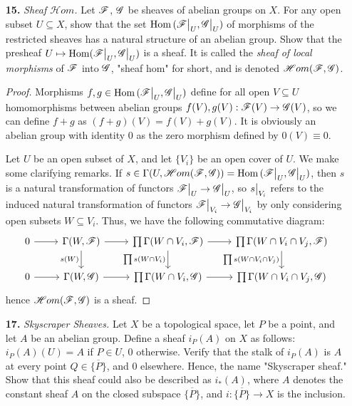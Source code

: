 \documentclass{article}
\begin{document}
\begin{enumerate} [label=\textbf{\arabic*.}, leftmargin=0em]
\item[\textbf{15.}] \textit{Sheaf $\mathscr{H}om$.} Let $\mathscr{F}$, $\mathscr{G}$ be sheaves of abelian groups on $X$. For any open subset $U \subseteq X$, show that the set $\Hom{(\restr{\fF}{U}, \restr{\fG}{U})}$ of morphisms of the restricted sheaves has a natural structure of an abelian group. Show that the presheaf $U \mapsto \Hom(\restr{\fF}{U}, \restr{\fG}{U})$ is a sheaf. It is called the \textit{sheaf of local morphisms} of $\mathscr{F}$ into $\mathscr{G}$, "sheaf hom" for short, and is denoted $\mathscr{H}om(\mathscr{F}, \mathscr{G})$.

\begin{proof}
    Morphisms $f, g \in \Hom{(\restr{\fF}{U}, \restr{\fG}{U})}$ define for all open $V \subseteq U$ homomorphisms between abelian groups $f(V), g(V) : \mathscr{F}(V) \to \mathscr{G}(V)$, so we can define $f + g$ as $(f + g)(V) = f(V) + g(V)$. It is obviously an abelian group with identity $0$ as the zero morphism defined by $0(V) \equiv 0$.

    Let $U$ be an open subset of $X$, and let $\{ V_i \}$ be an open cover of $U$. We make some clarifying remarks. If $s \in \Gamma(U, \mathscr{H}om{(\fF, \fG)}) = \Hom{(\restr{\fF}{U}, \restr{\fG}{U})}$, then $s$ is a natural transformation of functors $\restr{\fF}{U} \to \restr{\fG}{U}$, so $\restr{s}{V_i}$ refers to the induced natural transformation of functors $\restr{\fF}{V_i} \to \restr{\fG}{V_i}$ by only considering open subsets $W \subseteq V_i$. Thus, we have the following commutative diagram:
    \[ \begin{tikzcd}
        0 \arrow[r] & {\Gamma(W, \fF)} \arrow[r] \arrow[d, "s(W)"'] & {\prod \Gamma(W \cap V_i, \fF)} \arrow[r] \arrow[d, "\prod s(W \cap V_i)"'] & {\prod \Gamma(W \cap V_i \cap V_j, \fF)} \arrow[d, "\prod s(W \cap V_i \cap V_j)"'] \\
        0 \arrow[r]           & {\Gamma(W, \fG)} \arrow[r]                    & {\prod \Gamma(W \cap V_i, \fG)} \arrow[r]                                   & {\prod \Gamma(W \cap V_i \cap V_j, \fG)}                                           
        \end{tikzcd} \]
    hence $\mathscr{H}om(\mathscr{F}, \mathscr{G})$ is a sheaf.
\end{proof}

\item[\textbf{17.}] \textit{Skyscraper Sheaves.} Let $X$ be a topological space, let $P$ be a point, and let $A$ be an abelian group. Define a sheaf $i_P(A)$ on $X$ as follows: $i_P(A)(U) = A$ if $P\in U$, $0$ otherwise. Verify that the stalk of $i_P(A)$ is $A$ at every point $Q \in \overline{\{ P \}}$, and $0$ elsewhere. Hence, the name "Skyscraper sheaf." Show that this sheaf could also be described as $i_*(A)$, where $A$ denotes the constant sheaf $A$ on the closed subspace $\overline{\{ P \}}$, and $i : \overline{\{ P \}} \to X$ is the inclusion.


\end{enumerate}
\end{document}
